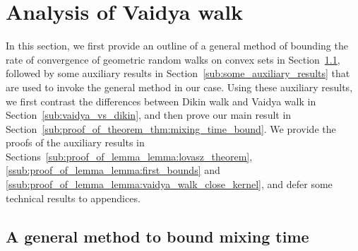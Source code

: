 

\section{Analysis of Vaidya walk} %
\label{sec:proof}

In this section, we first provide an outline of a general method of bounding the rate of convergence of geometric random walks on convex sets in Section~\ref{sub:a_general_method_to_bound_mixing_time}, followed by some auxiliary results in Section~\ref{sub:some_auxiliary_results} that are used to invoke the general method in our case.
Using these auxiliary results, we first contrast the differences between Dikin walk and Vaidya walk in Section~\ref{sub:vaidya_vs_dikin}, and then prove our main result in Section~\ref{sub:proof_of_theorem_thm:mixing_time_bound}.
We provide the proofs of the auxiliary results in Sections~\ref{sub:proof_of_lemma_lemma:lovasz_theorem}, \ref{ssub:proof_of_lemma_lemma:first_bounds} and \ref{ssub:proof_of_lemma_lemma:vaidya_walk_close_kernel}, and defer some technical results to appendices.

\subsection{A general method to bound mixing time} %
\label{sub:a_general_method_to_bound_mixing_time}


